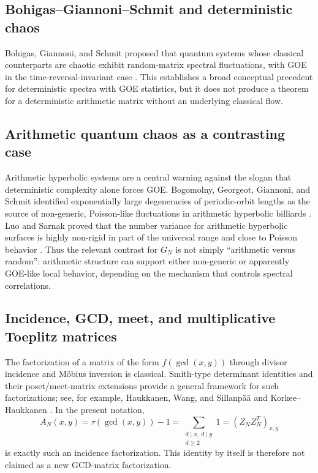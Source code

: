 \documentclass[11pt]{amsart}
\numberwithin{equation}{section}
\theoremstyle{plain}
\theoremstyle{definition}
\theoremstyle{remark}
\begin{document}
\subsection{Bohigas--Giannoni--Schmit and deterministic chaos}
\label{subsec:bgs_literature}

Bohigas, Giannoni, and Schmit proposed that quantum systems whose classical counterparts are chaotic exhibit random-matrix spectral fluctuations, with GOE in the time-reversal-invariant case \cite{BGS1984}.  This establishes a broad conceptual precedent for deterministic spectra with GOE statistics, but it does not produce a theorem for a deterministic arithmetic matrix without an underlying classical flow.

\subsection{Arithmetic quantum chaos as a contrasting case}
\label{subsec:arithmetic_quantum_chaos}

Arithmetic hyperbolic systems are a central warning against the slogan that deterministic complexity alone forces GOE.  Bogomolny, Georgeot, Giannoni, and Schmit identified exponentially large degeneracies of periodic-orbit lengths as the source of non-generic, Poisson-like fluctuations in arithmetic hyperbolic billiards \cite{BogomolnyEtAl1992}.  Luo and Sarnak proved that the number variance for arithmetic hyperbolic surfaces is highly non-rigid in part of the universal range and close to Poisson behavior \cite{LuoSarnak1994}.  Thus the relevant contrast for $G_N$ is not simply ``arithmetic versus random'': arithmetic structure can support either non-generic or apparently GOE-like local behavior, depending on the mechanism that controls spectral correlations.

\subsection{Incidence, GCD, meet, and multiplicative Toeplitz matrices}
\label{subsec:incidence_gcd_toeplitz}

The factorization of a matrix of the form $f(\gcd(x,y))$ through divisor incidence and M\"obius inversion is classical.  Smith-type determinant identities and their poset/meet-matrix extensions provide a general framework for such factorizations; see, for example, Haukkanen, Wang, and Sillanp\"a\"a \cite{HaukkanenWangSillanpaa1997} and Korkee--Haukkanen \cite{KorkeeHaukkanen2003}.  In the present notation,
\begin{equation}
A_N(x,y)=\tau(\gcd(x,y))-1
=\sum_{\substack{d\mid x,\ d\mid y\\d\ge2}}1
=(Z_NZ_N^T)_{x,y}
\label{eq:classical_gcd_incidence_factorization}
\end{equation}
is exactly such an incidence factorization.  This identity by itself is therefore not claimed as a new GCD-matrix factorization.
\end{document}
